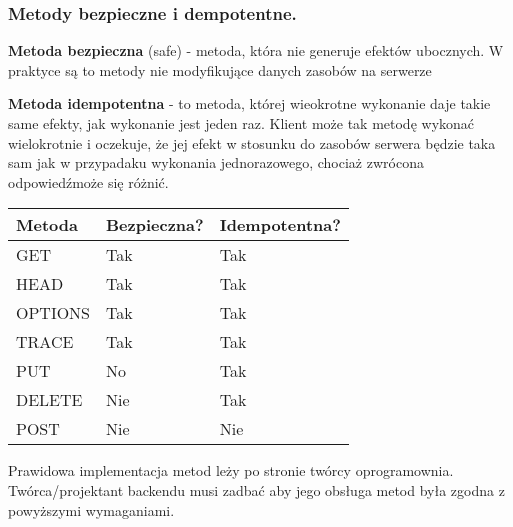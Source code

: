 \documentclass[../main.tex]{subfiles}
\begin{document}
    \subsubsection{Metody bezpieczne i dempotentne.}

    \begin{theorem}
        \textbf{Metoda bezpieczna} (safe) - metoda, która nie generuje efektów ubocznych. W praktyce są to metody nie modyfikujące danych zasobów na serwerze
    \end{theorem}

    \begin{theorem}
        \textbf{Metoda idempotentna} - to metoda, której wieokrotne wykonanie daje takie same efekty, jak wykonanie jest jeden raz. Klient może tak metodę wykonać wielokrotnie i oczekuje, że jej efekt w stosunku do zasobów serwera będzie taka sam jak w przypadaku wykonania jednorazowego, chociaż zwrócona odpowiedźmoże się różnić.
    \end{theorem}

    \begin{table}[H]
        \begin{center}
            \begin{tabular}{|p{5cm}|p{5cm}|p{5cm}|}
                \hline
                \textbf{Metoda} & \textbf{Bezpieczna?} & \textbf{Idempotentna?}\\
                \hline
                \hline
                GET & Tak & Tak \\
                \hline
                HEAD & Tak & Tak \\
                \hline
                OPTIONS & Tak & Tak \\
                \hline
                TRACE & Tak & Tak \\
                \hline
                PUT & No & Tak \\
                \hline
                DELETE & Nie & Tak \\
                \hline
                POST & Nie & Nie \\
                \hline
            \end{tabular}
        \end{center}
    \end{table}
    Prawidowa implementacja metod leży po stronie twórcy oprogramownia. Twórca/projektant backendu musi zadbać aby jego obsługa metod była zgodna z powyższymi wymaganiami.
\end{document}
